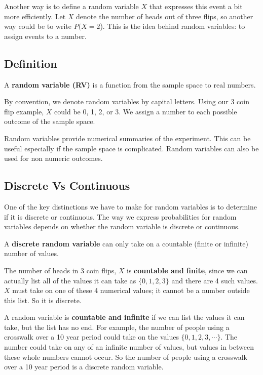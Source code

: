 \documentclass[
]{book}
\begin{document}
Another way is to define a random variable \(X\) that expresses this event a bit more efficiently. Let \(X\) denote the number of heads out of three flips, so another way could be to write \(P(X=2\)). This is the idea behind random variables: to assign events to a number.

\hypertarget{definition}{%
\subsection{Definition}\label{definition}}

A \textbf{random variable (RV)} is a function from the sample space to real numbers.

By convention, we denote random variables by capital letters. Using our 3 coin flip example, \(X\) could be 0, 1, 2, or 3. We assign a number to each possible outcome of the sample space.

Random variables provide numerical summaries of the experiment. This can be useful especially if the sample space is complicated. Random variables can also be used for non numeric outcomes.

\hypertarget{discrete-vs-continuous}{%
\subsection{Discrete Vs Continuous}\label{discrete-vs-continuous}}

One of the key distinctions we have to make for random variables is to determine if it is discrete or continuous. The way we express probabilities for random variables depends on whether the random variable is discrete or continuous.

A \textbf{discrete random variable} can only take on a countable (finite or infinite) number of values.

The number of heads in 3 coin flips, \(X\) is \textbf{countable and finite}, since we can actually list all of the values it can take as \(\{0,1,2,3 \}\) and there are 4 such values. \(X\) must take on one of these 4 numerical values; it cannot be a number outside this list. So it is discrete.

A random variable is \textbf{countable and infinite} if we can list the values it can take, but the list has no end. For example, the number of people using a crosswalk over a 10 year period could take on the values \(\{0, 1, 2, 3, \cdots \}\). The number could take on any of an infinite number of values, but values in between these whole numbers cannot occur. So the number of people using a crosswalk over a 10 year period is a discrete random variable.
\end{document}
